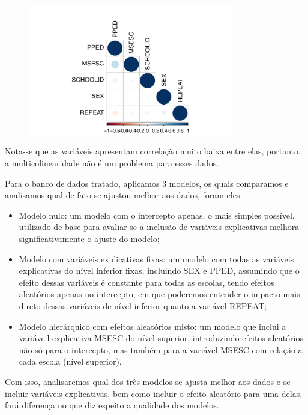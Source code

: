 \documentclass[
  letterpaper,
  DIV=11,
  numbers=noendperiod]{scrartcl}
\begin{document}
\begin{figure}

{\centering \includegraphics[width=0.8\textwidth,height=\textheight]{trabalho-final_files/figure-pdf/unnamed-chunk-1-1.pdf}

}

\end{figure}

Nota-se que as variáveis apresentam correlação muito baixa entre elas,
portanto, a multicolinearidade não é um problema para esses dados.

Para o banco de dados tratado, aplicamos 3 modelos, os quais comparamos
e analisamos qual de fato se ajustou melhor aos dados, foram eles:

\begin{itemize}
\item
  Modelo nulo: um modelo com o intercepto apenas, o mais simples
  possível, utilizado de base para avaliar se a inclusão de variáveis
  explicativas melhora significativamente o ajuste do modelo;
\item
  Modelo com variáveis explicativas fixas: um modelo com todas as
  variáveis explicativas do nível inferior fixas, incluindo SEX e PPED,
  assumindo que o efeito dessas variáveis é constante para todas as
  escolas, tendo efeitos aleatórios apenas no intercepto, em que
  poderemos entender o impacto mais direto dessas variáveis de nível
  inferior quanto a variável REPEAT;
\item
  Modelo hierárquico com efeitos aleatórios misto: um modelo que inclui
  a variáveil explicativa MSESC do nível superior, introduzindo efeitos
  aleatórios não só para o intercepto, mas também para a variável MSESC
  com relação a cada escola (nível superior).
\end{itemize}

Com isso, analisaremos qual dos três modelos se ajusta melhor aos dados
e se incluir variáveis explicativas, bem como incluir o efeito aleatório
para uma delas, fará diferença no que diz espeito a qualidade dos
modelos.
\end{document}
